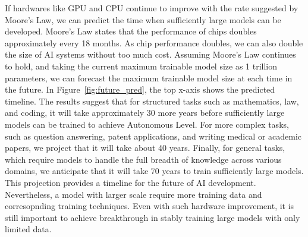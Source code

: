 If hardwares like GPU and CPU continue to improve with the rate suggested by Moore's Law, we can predict the time when sufficiently large models can be developed. Moore's Law states that the performance of chips doubles approximately every 18 months. As chip performance doubles, we can also double the size of AI systems without too much cost.
Assuming Moore's Law continues to hold, and taking the current maximum trainable model size as 1 trillion parameters, we can forecast the maximum trainable model size at each time in the future. In Figure~\ref{fig:future_pred}, the top x-axis shows the predicted timeline. The results suggest that for structured tasks such as mathematics, law, and coding, it will take approximately 30 more years before sufficiently large models can be trained to achieve Autonomous Level. For more complex tasks, such as question answering, patent applications, and writing medical or academic papers, we project that it will take about 40 years. Finally, for general tasks, which require models to handle the full breadth of knowledge across various domains, we anticipate that it will take 70 years to train sufficiently large models.
This projection provides a timeline for the future of AI development. Nevertheless, a model with larger scale require more training data and corresopnding training techniques. Even with such hardware improvement, it is still important to achieve breakthrough in stably training large models with only limited data.




